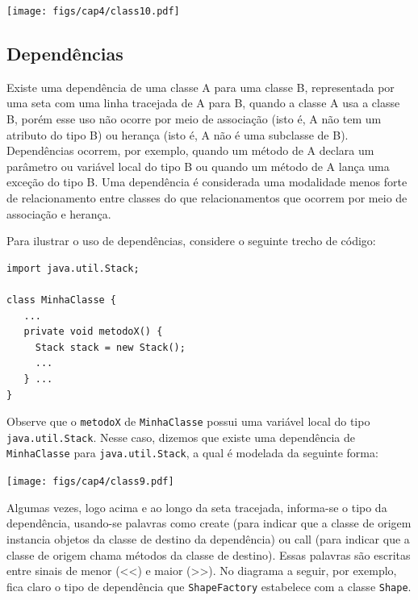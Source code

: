 \documentclass[
  11pt,
  twoside]{book}
\newcommand{\passthrough}[1]{#1}
\begin{document}
\texttt{[image: figs/cap4/class10.pdf]}

\hypertarget{dependuxeancias}{%
\subsection{Dependências}\label{dependuxeancias}}


Existe uma dependência de uma classe A para uma classe B, representada
por uma seta com uma linha tracejada de A para B, quando a classe A usa
a classe B, porém esse uso não ocorre por meio de associação (isto é, A
não tem um atributo do tipo B) ou herança (isto é, A não é uma subclasse
de B). Dependências ocorrem, por exemplo, quando um método de A declara
um parâmetro ou variável local do tipo B ou quando um método de A lança
uma exceção do tipo B. Uma dependência é considerada uma modalidade
menos forte de relacionamento entre classes do que relacionamentos que
ocorrem por meio de associação e herança.

Para ilustrar o uso de dependências, considere o seguinte trecho de
código:

\begin{lstlisting}
import java.util.Stack;

class MinhaClasse {
   ...
   private void metodoX() {
     Stack stack = new Stack();
     ...
   } ...
}
\end{lstlisting}

Observe que o \passthrough{\lstinline!metodoX!} de
\passthrough{\lstinline!MinhaClasse!} possui uma variável local do tipo
\passthrough{\lstinline!java.util.Stack!}. Nesse caso, dizemos que
existe uma dependência de \passthrough{\lstinline!MinhaClasse!} para
\passthrough{\lstinline!java.util.Stack!}, a qual é modelada da seguinte
forma:

\texttt{[image: figs/cap4/class9.pdf]}

Algumas vezes, logo acima e ao longo da seta tracejada, informa-se o
tipo da dependência, usando-se palavras como create (para indicar que a
classe de origem instancia objetos da classe de destino da dependência)
ou call (para indicar que a classe de origem chama métodos da classe de
destino). Essas palavras são escritas entre sinais de menor
(\textless\textless) e maior (\textgreater\textgreater). No diagrama a
seguir, por exemplo, fica claro o tipo de dependência que
\passthrough{\lstinline!ShapeFactory!} estabelece com a classe
\passthrough{\lstinline!Shape!}.
\end{document}
